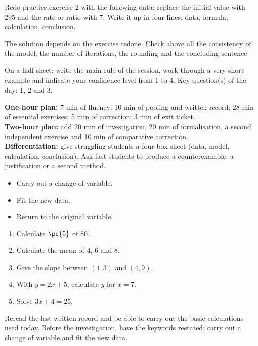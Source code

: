 
\begin{homework}Redo practice exercise 2 with the following data: replace the initial value with $295$ and the rate or ratio with $7$. Write it up in four lines: data, formula, calculation, conclusion.\end{homework}
\begin{solution}The solution depends on the exercise redone. Check above all the consistency of the model, the number of iterations, the rounding and the concluding sentence.\end{solution}

\begin{exitticket}[3 minutes]On a half-sheet: write the main rule of the session, work through a very short example and indicate your confidence level from 1 to 4. Key question(s) of the day: 1, 2 and 3.\end{exitticket}

\ifmxteacher
\begin{method}
\textbf{One-hour plan:} 7 min of fluency; 10 min of pooling and written record; 28 min of essential exercises; 5 min of correction; 3 min of exit ticket.\\
\textbf{Two-hour plan:} add 20 min of investigation, 20 min of formalisation, a second independent exercise and 10 min of comparative correction.\\
\textbf{Differentiation:} give struggling students a four-box sheet (data, model, calculation, conclusion). Ask fast students to produce a counterexample, a justification or a second method.
\end{method}
\fi
{}
\begin{objectives}\begin{itemize}\item Carry out a change of variable.\item Fit the new data.\item Return to the original variable.\end{itemize}\end{objectives}
\begin{fluency}\begin{enumerate}\item Calculate $\pc{5}$ of $80$. \item Calculate the mean of $4$, $6$ and $8$. \item Give the slope between $(1,3)$ and $(4,9)$. \item With $y=2x+5$, calculate $y$ for $x=7$. \item Solve $3x+4=25$. \end{enumerate}\end{fluency}
\begin{prerequisites}Reread the last written record and be able to carry out the basic calculations used today. Before the investigation, have the keywords restated: carry out a change of variable and fit the new data.\end{prerequisites}

